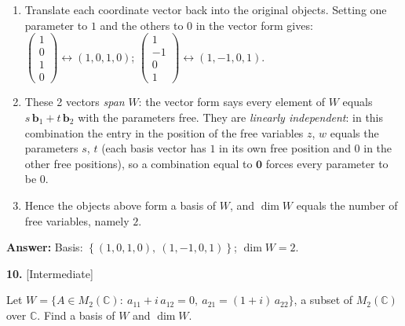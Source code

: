 \documentclass[11pt]{article}
\begin{document}
\begin{tcolorbox}[breakable,colback=ans,colframe=ansb,boxrule=0.5pt,left=4pt,right=4pt,top=2pt,bottom=2pt]
\begin{enumerate}[leftmargin=3.1em,itemsep=1pt,topsep=1pt,label=\textbf{Step \arabic*.}]
\item Translate each coordinate vector back into the original objects. Setting one parameter to $1$ and the others to $0$ in the vector form gives: $\begin{pmatrix}1\\0\\1\\0\end{pmatrix}\leftrightarrow (1,0,1,0)$; $\begin{pmatrix}1\\-1\\0\\1\end{pmatrix}\leftrightarrow (1,-1,0,1)$.
\item These 2 vectors \emph{span} $W$: the vector form says every element of $W$ equals $s\,\mathbf b_1+t\,\mathbf b_2$ with the parameters free. They are \emph{linearly independent}: in this combination the entry in the position of the free variables $z$, $w$ equals the parameters $s$, $t$ (each basis vector has $1$ in its own free position and $0$ in the other free positions), so a combination equal to $\mathbf 0$ forces every parameter to be $0$.
\item Hence the objects above form a basis of $W$, and $\dim W$ equals the number of free variables, namely $2$.
\end{enumerate}\textbf{Answer:} Basis: $\left\{(1,0,1,0),\ (1,-1,0,1)\right\}$; $\dim W=2$.\end{tcolorbox}
\par\vspace{2pt}
\begin{minipage}{\linewidth}\textbf{10.} \hfill{\scriptsize\color{ink}[Intermediate]}\par\nopagebreak Let $W=\{A\in M_2(\mathbb{C}):\ a_{11}+i\,a_{12}=0,\ a_{21}=(1+i)\,a_{22}\}$, a subset of $M_2(\mathbb{C})$ over $\mathbb{C}$. Find a basis of $W$ and $\dim W$.
\end{minipage}\par\nopagebreak
\end{document}
